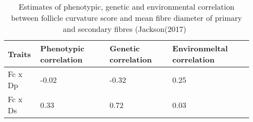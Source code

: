 %

\begin{table}[htp]
\centering
\caption{Estimates of phenotypic, genetic and environmental correlation between follicle curvature score and mean fibre diameter of primary and secondary fibres (Jackson(2017)~\cite{jackson-2017a}}
\label{tab:fcdpds}
\vspace{0.1in}
\begin{tabular}{|p{2.0in}|p{1.0in}|p{1.0in}|p{1.0in}|}  \hline
 Traits  & Phenotypic correlation  &  Genetic correlation & Environmeltal correlation  \\ 
\hline 
Fc x Dp & -0.02 & -0.32 & 0.25 \\
Fc x Ds    & 0.33 & 0.72 & 0.03 \\
\hline

\end{tabular}
\end{table}

%
